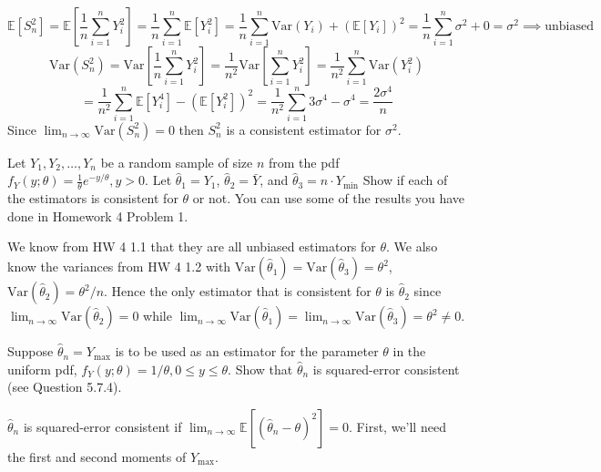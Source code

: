 \documentclass{article}
\newcommand{\E}{\mathbb{E}}
\newcommand{\V}{\text{Var}}
\begin{document}
\begin{probset}
\begin{prob}[\textbf{5.7.2}]
    \begin{soln}
        \[
            \E[S^2_n] = \E\left[\frac{1}{n} \sum_{i=1}^n Y_i^2 \right] = \frac{1}{n} \sum_{i=1}^n \E[Y_i^2] = \frac{1}{n} \sum_{i=1}^n \V(Y_i) + (\E[Y_i])^2 = \frac{1}{n} \sum_{i=1}^n \sigma^2 + 0 = \sigma^2 \implies \text{unbiased}
        \]
        \[
            \V(S^2_n) = \V\left[\frac{1}{n} \sum_{i=1}^n Y_i^2 \right] = \frac{1}{n^2} \V\left[\sum_{i=1}^n Y_i^2 \right] = \frac{1}{n^2} \sum_{i=1}^n \V(Y_i^2)
        \]
        \[
            = \frac{1}{n^2} \sum_{i=1}^n \E[Y_i^4] - \left(\E[Y_i^2]\right)^2 = \frac{1}{n^2} \sum_{i=1}^n 3\sigma^4 - \sigma^4 = \frac{2\sigma^4}{n}
        \]
        Since $\lim_{n \to \infty} \V(S^2_n) = 0$ then $S^2_n$ is a consistent estimator for $\sigma^2$.
    \end{soln}
\end{prob}

\begin{prob}
    Let $Y_1, Y_2, \dots, Y_n$ be a random sample of size $n$ from the pdf $f_Y(y; \theta) = \frac{1}{\theta} e^{-y/\theta}, y > 0$. Let $\hat\theta_1 = Y_1$, $\hat\theta_2 = \bar Y$, and $\hat\theta_3 = n \cdot Y_{\min}$ Show if each of the estimators is consistent for $\theta$ or not. You can use some of the results you have done in Homework 4 Problem 1.

    \begin{soln}
        We know from HW 4 1.1 that they are all unbiased estimators for $\theta$. We also know the variances from HW 4 1.2 with $\V(\hat\theta_1) = \V(\hat\theta_3) = \theta^2$, $\V(\hat\theta_2) = \theta^2/n$. Hence the only estimator that is consistent for $\theta$ is $\hat\theta_2$ since $\lim_{n \to \infty} \V(\hat\theta_2) = 0$ while $\lim_{n \to \infty} \V(\hat\theta_1) = \lim_{n \to \infty} \V(\hat\theta_3) = \theta^2 \neq 0$.
    \end{soln}
\end{prob}

\newpage

\begin{prob}
    Suppose $\hat\theta_n = Y_{\max}$ is to be used as an estimator for the parameter $\theta$ in the uniform pdf, $f_Y(y; \theta) = 1/\theta, 0 \leq y \leq \theta$. Show that $\hat\theta_n$ is squared-error consistent (see Question 5.7.4).

    \begin{soln}
        $\hat\theta_n$ is squared-error consistent if $\lim_{n \to \infty} \E[(\hat\theta_n - \theta)^2] = 0$. First, we'll need the first and second moments of $Y_{\max}$.


\end{soln}
\end{prob}
\end{probset}
\end{document}
